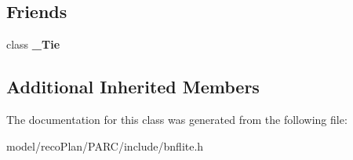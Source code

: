 \subsection*{Friends}
\begin{DoxyCompactItemize}
\item 
\mbox{\label{classbnf_1_1___ctrl_ab555bd08f573aad86ad95feb76007c15}} 
class {\bfseries \+\_\+\+Tie}
\end{DoxyCompactItemize}
\subsection*{Additional Inherited Members}


The documentation for this class was generated from the following file\+:\begin{DoxyCompactItemize}
\item 
model/reco\+Plan/\+P\+A\+R\+C/include/bnflite.\+h\end{DoxyCompactItemize}
